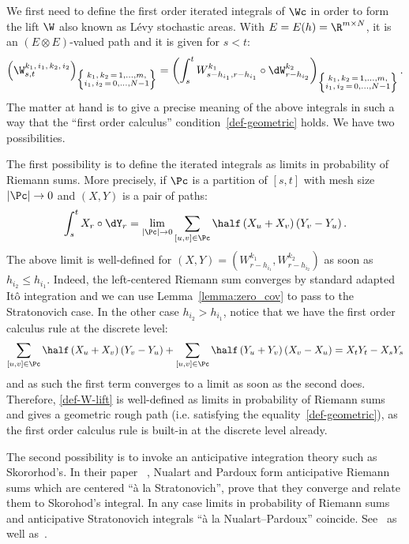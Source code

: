 We first need to define the first order iterated integrals of $\Wc$ in order to form the lift $\W$ also known as Lévy stochastic areas. With $E = E(h)=\R^{m \times N}$, it is an $(E \otimes E)$-valued path and it is given for $s<t$:
\begin{equation}\label{def-W-lift}
\left(\W_{s,t}^{k_1,\,i_1,\,k_2,\,i_2}\right)_{\left\{\substack{k_1,\,k_2\,=\,1,\dots, m,\\i_1,\,i_2\,=\,0,\dots,N-1}\right\}}%
= \left(\int_{s}^t W^{k_1}_{s-h_{i_1},r-h_{i_1}}
\circ \dW^{k_2}_{r-h_{i_2}}\right)_{\left\{\substack{k_1,\,k_2\,=\,1,\dots,m,\\ i_1,\,i_2\,=\,0,\dots,N-1}\right\}} .
\end{equation}
The matter at hand is to give a precise meaning of the above integrals in such a way that the ``first order calculus'' condition~\eqref{def-geometric} holds. We have two possibilities.

The first possibility is to define the iterated integrals as limits in probability of Riemann sums. More precisely, if $\Pc$ is a partition of $[s,t]$ with mesh size $|\Pc| \rightarrow 0$ and $(X,Y)$ is a pair of paths:
\[
\int_{s}^t X_r \circ \dY_r
= \lim_{|\Pc| \rightarrow 0}
\sum_{[u,v] \in \Pc}
\half \left(X_u + X_v \right)
\left(Y_v - Y_u \right)
.
\]
The above limit is well-defined for $\left(X, Y \right) = \left(W^{k_1}_{r-h_{i_1}}, W^{k_2}_{r-h_{i_2}}\right)$ as soon as $h_{i_2} \leq h_{i_1}$. Indeed, the left-centered Riemann sum converges by standard adapted Itô integration and we can use Lemma~\ref{lemma:zero_cov} to pass to the Stratonovich case. In the other case $h_{i_2} > h_{i_1}$, notice that we have the first order calculus rule at the discrete level:
\begin{equation}\label{eq-discrete-first-order}
\sum_{[u,v] \in \Pc} \half \left(X_u + X_v \right)\left(Y_v - Y_u \right) + \sum_{[u,v] \in \Pc} \half \left(Y_u + Y_v \right)\left(X_v - X_u \right) = X_t Y_t - X_s Y_s
\end{equation}
and as such the first term converges to a limit as soon as the second does. Therefore, \eqref{def-W-lift} is well-defined as limits in probability of Riemann sums and gives a geometric rough path (i.e. satisfying the equality~\eqref{def-geometric}), as the first order calculus rule is built-in at the discrete level already.

The second possibility is to invoke an anticipative integration theory such as Skororhod's. In their paper~\cite[Section~4]{nualart1988stochastic} , Nualart and Pardoux form anticipative Riemann sums which are centered ``à la Stratonovich'', prove that they converge and relate them to Skorohod's integral. In any case limits in probability of Riemann sums and anticipative Stratonovich integrals ``à la Nualart--Pardoux'' coincide. See~\cite[Exercise~5.17]{FH14} as well as~\cite{ocone1989generalized}.

